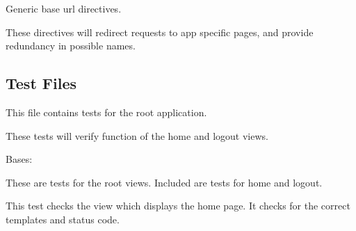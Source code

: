 \documentclass[letterpaper,10pt,english]{sphinxmanual}
\begin{document}
\label{api:module-mousedb.urls}
Generic base url directives.

These directives will redirect requests to app specific pages, and provide redundancy in possible names.


\subsection{Test Files}
\label{api:test-files}\label{api:module-mousedb.tests}
This file contains tests for the root application.

These tests will verify function of the home and logout views.

\begin{fulllineitems}
\label{api:mousedb.tests.RootViewTests}
Bases: 

These are tests for the root views.  Included are tests for home and logout.

\begin{fulllineitems}
\label{api:mousedb.tests.RootViewTests.fixtures}
\end{fulllineitems}


\begin{fulllineitems}
\label{api:mousedb.tests.RootViewTests.setUp}
\end{fulllineitems}


\begin{fulllineitems}
\label{api:mousedb.tests.RootViewTests.tearDown}
\end{fulllineitems}


\begin{fulllineitems}
\label{api:mousedb.tests.RootViewTests.test_home}
This test checks the view which displays the home page.  It checks for the correct templates and status code.


\end{fulllineitems}
\end{fulllineitems}
\end{document}
